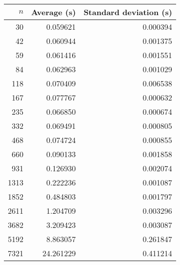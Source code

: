 \begin{tabular}{rrr}
$n$ & Average (s) & Standard deviation (s)\\\hline
30 & 0.059621 & 0.000394\\
42 & 0.060944 & 0.001375\\
59 & 0.061416 & 0.001551\\
84 & 0.062963 & 0.001029\\
118 & 0.070409 & 0.006538\\
167 & 0.077767 & 0.000632\\
235 & 0.066850 & 0.000674\\
332 & 0.069491 & 0.000805\\
468 & 0.074724 & 0.000855\\
660 & 0.090133 & 0.001858\\
931 & 0.126930 & 0.002074\\
1313 & 0.222236 & 0.001087\\
1852 & 0.484803 & 0.001797\\
2611 & 1.204709 & 0.003296\\
3682 & 3.209423 & 0.003087\\
5192 & 8.863057 & 0.261847\\
7321 & 24.261229 & 0.411214\\
\end{tabular}
